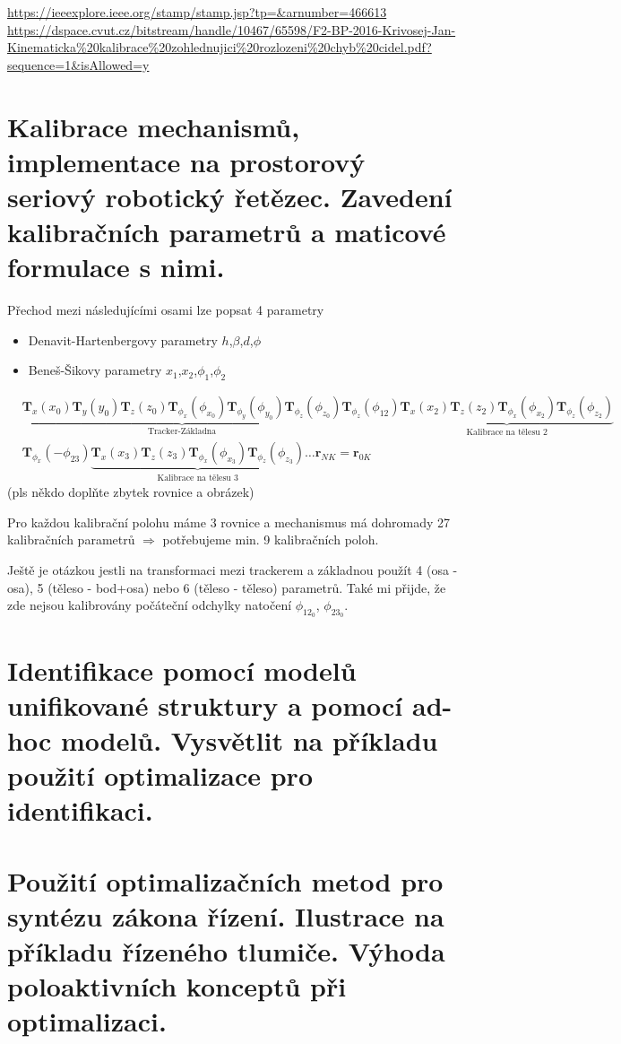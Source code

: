 \documentclass{article}
\begin{document}
	\url{https://ieeexplore.ieee.org/stamp/stamp.jsp?tp=&arnumber=466613} \\
	\url{https://dspace.cvut.cz/bitstream/handle/10467/65598/F2-BP-2016-Krivosej-Jan-Kinematicka%20kalibrace%20zohlednujici%20rozlozeni%20chyb%20cidel.pdf?sequence=1&isAllowed=y}

	\section{Kalibrace mechanismů, implementace na prostorový seriový robotický řetězec. Zavedení kalibračních parametrů a maticové formulace s nimi.}

	Přechod mezi následujícími osami lze popsat 4 parametry
	\begin{itemize}
		\item Denavit-Hartenbergovy parametry $h$,$\beta$,$d$,$\phi$
		\item Beneš-Šikovy parametry $x_1$,$x_2$,$\phi_1$,$\phi_2$
	\end{itemize}

	\begin{align}
		&\underbrace{
			\bm{T}_x(x_0)\bm{T}_y(y_0)\bm{T}_z(z_0)\bm{T}_{\phi_x}(\phi_{x_0})\bm{T}_{\phi_y}(\phi_{y_0})\bm{T}_{\phi_z}(\phi_{z_0})
		}_{\text{Tracker-Základna}}
		\bm{T}_{\phi_z}(\phi_{12})
		\underbrace{
			\bm{T}_x(x_2)\bm{T}_z(z_2)\bm{T}_{\phi_x}(\phi_{x_2})\bm{T}_{\phi_z}(\phi_{z_2})
		}_{\text{Kalibrace na tělesu 2}}\\&
		\bm{T}_{\phi_x}(-\phi_{23})
		\underbrace{
			\bm{T}_x(x_3)\bm{T}_z(z_3)\bm{T}_{\phi_x}(\phi_{x_3})\bm{T}_{\phi_z}(\phi_{z_3})
		}_{\text{Kalibrace na tělesu 3}}
		\ldots
		\bm{r}_{N K} = \bm{r}_{0K}
	\end{align}
	(pls někdo doplňte zbytek rovnice a obrázek)

	Pro každou kalibrační polohu máme 3 rovnice a mechanismus má dohromady 27 kalibračních parametrů $\Rightarrow$ potřebujeme min. 9 kalibračních poloh.

	Ještě je otázkou jestli na transformaci mezi trackerem a základnou použít 4 (osa - osa), 5 (těleso - bod+osa) nebo 6 (těleso - těleso) parametrů. Také mi přijde, že zde nejsou kalibrovány počáteční odchylky natočení $\phi_{12_0}$, $\phi_{23_0}$.

	\section{Identifikace pomocí modelů unifikované struktury a pomocí ad-hoc modelů. Vysvětlit na příkladu použití optimalizace pro identifikaci.}

	\section{Použití optimalizačních metod pro syntézu zákona řízení. Ilustrace na příkladu řízeného tlumiče. Výhoda poloaktivních konceptů při optimalizaci.}
\end{document}
